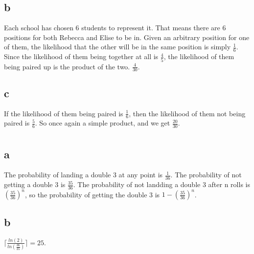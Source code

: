 \documentclass[12pt]{article}
\begin{document}
\subsection*{b}
Each school has chosen 6 students to represent it. That means there are 6 positions for both Rebecca and Elise to be in. Given an arbitrary position for one of them, the likelihood that the other will be in the same position is simply \(\frac{1}{6}\). Since the likelihood of them being together at all is \(\frac{4}{5}\), the likelihood of them being paired up is the product of the two. \(\frac{4}{30}\).
\subsection*{c}
If the likelihood of them being paired is \(\frac{1}{6}\), then the likelihood of them not being paired is \(\frac{5}{6}\). So once again a simple product, and we get \(\frac{20}{30}\).
\section{}
\subsection*{a}
The probability of landing a double 3 at any point is \(\frac{1}{36}\). The probability of not getting a double 3 is \(\frac{35}{36}\). The probability of not landding a double 3 after n rolls is \((\frac{35}{36})^n\), so the probability of getting the double 3 is \(1-(\frac{35}{36})^n\).
\subsection*{b}
\(\lceil\frac{ln(2)}{ln(\frac{36}{35})}\rceil = 25\).
\end{document}
